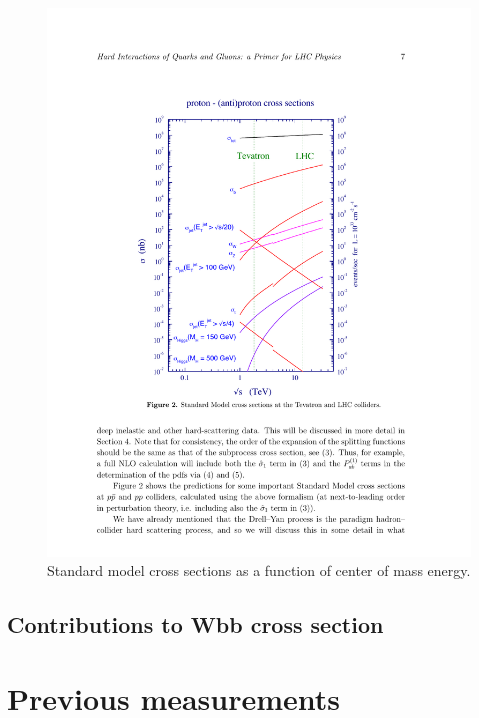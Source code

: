 \begin{figure}[htbp]
	\centering
		\includegraphics{Figures/pp_xsec.pdf}
	\caption[Proton-proton cross sections]{Standard model cross sections as a function of center of mass energy.\citep{Campbell:2006wx} }
	\label{fig:pp_xsec}
\end{figure}


\subsection{Contributions to Wbb cross section}




\section{Previous measurements}

